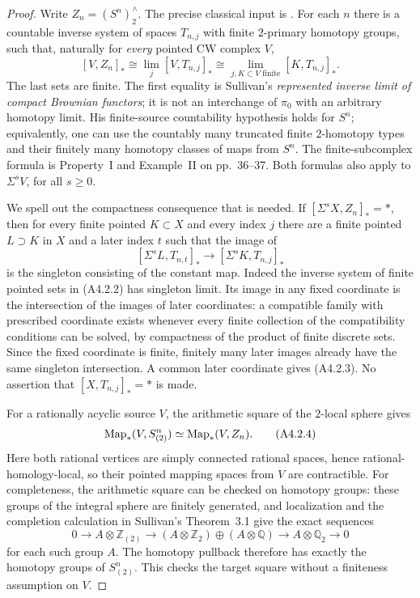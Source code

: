 \begin{proof}
Write $Z_n=(S^n)^\wedge_2$.  The precise classical input is
\citet[Section~3, pp.~34--41, Property~iii on p.~49, and the
prime-wise version on p.~52]{A4SullivanGenetics}.  For each $n$ there
is a countable inverse system of spaces $T_{n,j}$ with finite
$2$-primary homotopy groups, such that, naturally for \emph{every}
pointed CW complex $V$,
\[
 [V,Z_n]_*
   \cong\lim_j[V,T_{n,j}]_*
   \cong\lim_{j,K\subset V\text{ finite}}[K,T_{n,j}]_*.
 \tag{A4.2.2}
\]
The last sets are finite.  The first equality is Sullivan's
\emph{represented inverse limit of compact Brownian functors}; it
is not an interchange of $\pi_0$ with an arbitrary homotopy limit.
His finite-source countability hypothesis holds for $S^n$; equivalently,
one can use the countably many truncated finite $2$-homotopy types
and their finitely many homotopy classes of maps from $S^n$.
The finite-subcomplex formula is Property~I and Example~II on
pp.~36--37.  Both formulas also apply to $\Sigma^sV$, for all $s\geq0$.

We spell out the compactness consequence that is needed.  If
$[\Sigma^sX,Z_n]_*=*$, then for every finite pointed $K\subset X$
and every index $j$ there are a finite pointed $L\supset K$ in $X$
and a later index $t$ such that the image of
\[
 [\Sigma^sL,T_{n,t}]_*\longrightarrow
 [\Sigma^sK,T_{n,j}]_*
 \tag{A4.2.3}
\]
is the singleton consisting of the constant map.  Indeed the
inverse system of finite pointed sets in \textup{(A4.2.2)} has
singleton limit.  Its image in any fixed coordinate is the
intersection of the images of later coordinates: a compatible
family with prescribed coordinate exists whenever every finite
collection of the compatibility conditions can be solved, by
compactness of the product of finite discrete sets.  Since the fixed
coordinate is finite, finitely many later images already have the
same singleton intersection.  A common later coordinate gives
\textup{(A4.2.3)}.  No assertion that $[X,T_{n,j}]_*=*$ is made.

For a rationally acyclic source $V$, the arithmetic square of the
$2$-local sphere gives
\[
 \operatorname{Map}_*(V,S^n_{(2)})\simeq\operatorname{Map}_*(V,Z_n).
 \tag{A4.2.4}
\]
Here both rational vertices are simply connected rational spaces,
hence rational-homology-local, so their pointed mapping spaces from
$V$ are contractible.  For completeness, the arithmetic square can
be checked on homotopy groups: these groups of the integral sphere
are finitely generated, and localization and the completion
calculation in Sullivan's Theorem~3.1 give the exact sequences
\[
 0\longrightarrow A\otimes\mathbb Z_{(2)}
 \longrightarrow (A\otimes\mathbb Z_2)\oplus(A\otimes\mathbb Q)
 \longrightarrow A\otimes\mathbb Q_2\longrightarrow0
\]
for each such group $A$.  The homotopy pullback therefore has exactly
the homotopy groups of $S^n_{(2)}$.  This checks the target square
without a finiteness assumption on $V$.


\end{proof}
